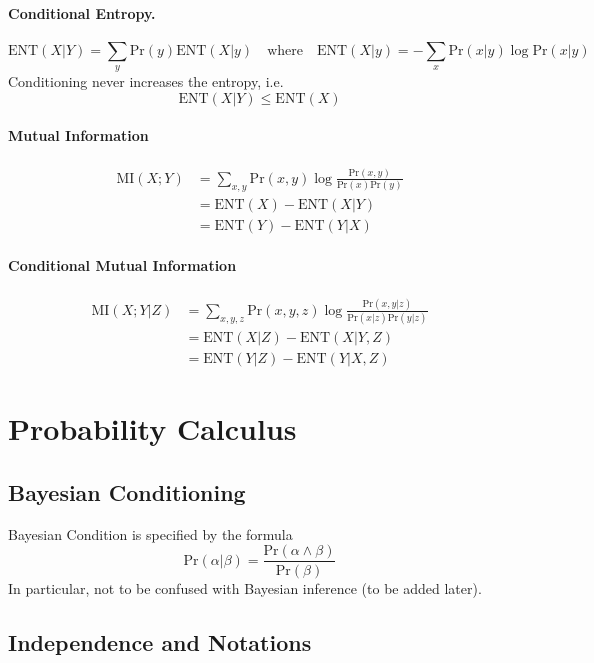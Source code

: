 \documentclass[11pt]{article}
\newcommand{\pr}{\mathrm{Pr}}
\newcommand{\ent}{\mathrm{ENT}}
\newcommand{\mi}{\mathrm{MI}}
\begin{document}
\paragraph{Conditional Entropy. }
\begin{equation}
	\ent (X | Y ) = \sum_y \pr (y) \ent(X | y) \quad \text{where} \quad \ent (X|y) = - \sum_{x} \pr(x|y) \log \pr(x | y)
\end{equation}
Conditioning never increases the entropy, i.e. 
\begin{equation}
	\ent (X | Y) \leq \ent (X)
\end{equation}

\paragraph{Mutual Information} 
\begin{align}
	\mi(X; Y) 
	&= \sum_{x, y} \pr (x, y) \log \frac{\pr (x, y)}{\pr (x) \pr (y)} \\
	&= \ent (X) - \ent (X | Y) \\
	&= \ent (Y) - \ent ( Y | X) 
\end{align}

\paragraph{Conditional Mutual Information}
\begin{align}
	\mi ( X; Y | Z) 
	&= \sum_{x, y, z} \pr (x, y , z) \log \frac{\pr (x, y | z)}{\pr (x | z) \pr(y | z)} \\
	&= \ent (X | Z) - \ent (X | Y, Z) \\
	&= \ent (Y | Z) - \ent (Y | X, Z)
\end{align}

\section{Probability Calculus}
\subsection{Bayesian Conditioning}
Bayesian Condition is specified by the formula 
\begin{equation}
	\pr ( \alpha | \beta) = \frac{\pr ( \alpha \land \beta )}{\pr ( \beta) }
\end{equation}
In particular, not to be confused with Bayesian inference (to be added later). 

\subsection{Independence and Notations}
\end{document}
